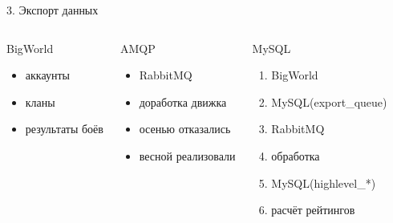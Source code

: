 \documentclass{beamer}
\begin{document}
\begin{frame}{3. Экспорт данных}
    \begin{columns}
            \begin{block}{BigWorld}
                \begin{itemize}
                    \item{аккаунты}
                    \item{кланы}
                    \item{результаты боёв}
                \end{itemize}
            \end{block}

            \pause
            \begin{block}{AMQP}
                \begin{itemize}
                    \item{RabbitMQ}
                    \item{доработка движка}
                    \item{осенью отказались}
                    \item{весной реализовали}
                \end{itemize}
            \end{block}
 
            \pause
            \begin{block}{MySQL}
                \begin{enumerate}
                    \item{BigWorld}
                    \item{MySQL(export\_queue)}
                    \item{RabbitMQ}
                    \item{обработка}
                    \item{MySQL(highlevel\_*)}
                    \item{расчёт рейтингов}
                \end{enumerate}
            \end{block}
    \end{columns}
\end{frame}
\end{document}
